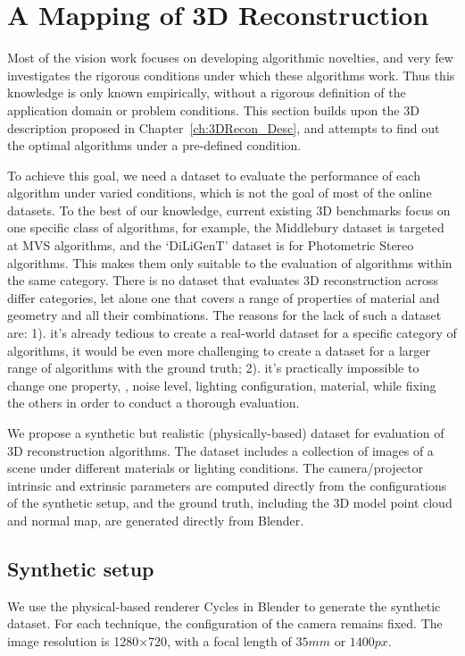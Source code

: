 
\chapter{A Mapping of 3D Reconstruction}
\label{ch:3DRecon_Mapping}
Most of the vision work focuses on developing algorithmic novelties, and very few investigates the rigorous conditions under which these algorithms work. Thus this knowledge is only known empirically, without a rigorous definition of the application domain or problem conditions. This section builds upon the 3D description proposed in Chapter~\ref{ch:3DRecon_Desc}, and attempts to find out the optimal algorithms under a pre-defined condition.

To achieve this goal, we need a dataset to evaluate the performance of each algorithm under varied conditions, which is not the goal of most of the online datasets. To the best of our knowledge, current existing 3D benchmarks focus on one specific class of algorithms, for example, the Middlebury dataset is targeted at MVS algorithms, and the `DiLiGenT' dataset is for Photometric Stereo algorithms. This makes them only suitable to the evaluation of algorithms within the same category. There is no dataset that evaluates 3D reconstruction across differ categories, let alone one that covers a range of properties of material and geometry and all their combinations. The reasons for the lack of such a dataset are: 1). it's already tedious to create a real-world dataset for a specific category of algorithms, it would be even more challenging to create a dataset for a larger range of algorithms with the ground truth; 2). it's practically impossible to change one property, \eg, noise level, lighting configuration, material, \etc while fixing the others in order to conduct a thorough evaluation.

We propose a synthetic but realistic (physically-based) dataset for evaluation of 3D reconstruction algorithms. The dataset includes a collection of images of a scene under different materials or lighting conditions. The camera/projector intrinsic and extrinsic parameters are computed directly from the configurations of the synthetic setup, and the ground truth, including the 3D model point cloud and normal map, are generated directly from Blender.

\section{Synthetic setup}
We use the physical-based renderer Cycles in Blender to generate the synthetic dataset. For each technique, the configuration of the camera remains fixed. The image resolution is 1280$\times$720, with a focal length of $35mm$ or $1400px$.

